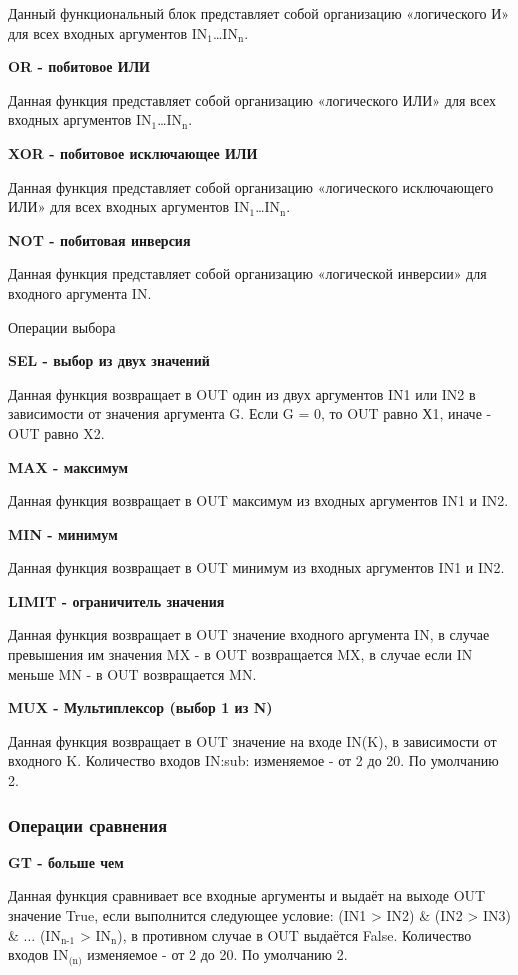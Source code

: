 \documentclass[letterpaper,10pt,russian]{sphinxmanual}
\begin{document}
Данный функциональный блок представляет собой организацию «логического
И» для всех входных аргументов IN$_{\text{1}}$…IN$_{\text{n}}$.

\textbf{OR - побитовое ИЛИ}

Данная функция представляет собой организацию «логического ИЛИ» для всех
входных аргументов IN$_{\text{1}}$…IN$_{\text{n}}$.

\textbf{XOR - побитовое исключающее ИЛИ}

Данная функция представляет собой организацию «логического исключающего
ИЛИ» для всех входных аргументов IN$_{\text{1}}$…IN$_{\text{n}}$.

\textbf{NOT - побитовая инверсия}

Данная функция представляет собой организацию «логической инверсии» для
входного аргумента IN.

Операции выбора

\textbf{SEL - выбор из двух значений}

Данная функция возвращает в OUT один из двух аргументов IN1 или IN2 в
зависимости от значения аргумента G. Если G = 0, то OUT равно Х1, иначе
- OUT равно X2.

\textbf{MAX - максимум}

Данная функция возвращает в OUT максимум из входных аргументов IN1 и
IN2.

\textbf{MIN - минимум}

Данная функция возвращает в OUT минимум из входных аргументов IN1 и IN2.

\textbf{LIMIT - ограничитель значения}

Данная функция возвращает в OUT значение входного аргумента IN, в случае
превышения им значения MX - в OUT возвращается MX, в случае если IN
меньше MN - в OUT возвращается MN.

\textbf{MUX - Мультиплексор (выбор 1 из N)}

Данная функция возвращает в OUT значение на входе IN(K), в зависимости
от входного K. Количество входов IN:sub: изменяемое - от 2 до 20. По
умолчанию 2.


\subsubsection{Операции сравнения}
\label{usage_guide/library:id7}
\textbf{GT - больше чем}

Данная функция сравнивает все входные аргументы и выдаёт на выходе OUT
значение True, если выполнится следующее условие: (IN1 \textgreater{} IN2) \& (IN2 \textgreater{}
IN3) \& ... (IN$_{\text{n-1}}$ \textgreater{} IN$_{\text{n}}$), в противном случае в OUT
выдаётся False. Количество входов IN$_{\text{(n)}}$ изменяемое - от 2 до
20. По умолчанию 2.
\end{document}
